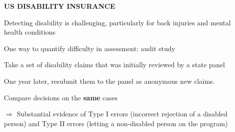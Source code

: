 \documentclass[landscape]{slides}
\begin{document}
\begin{slide}
\begin{center}
{\bf US DISABILITY INSURANCE}
\end{center}

Detecting disability is challenging, particularly for back injuries and mental health conditions

One way to quantify difficulty in assessment: audit study

Take a set of disability claims that was initially reviewed by a state panel

One year later, resubmit them to the panel as anonymous new claims.

Compare decisions on the \textbf{same} cases

$\Rightarrow$ Substantial evidence of Type I errors (incorrect rejection of a disabled person) and Type II errors
(letting a non-disabled person on the program)

\end{slide}


\begin{slide}

\end{slide}


%
%
%
%
%
%
%
%
%
%
%
%
%
\end{document}
